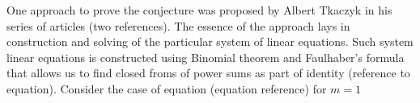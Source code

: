 One approach to prove the conjecture was proposed by Albert Tkaczyk in his series of articles (two references).
The essence of the approach lays in construction and solving of the particular system of linear equations.
Such system linear equations is constructed using Binomial theorem and Faulhaber's formula
that allows us to find closed froms of power sums as part of identity (reference to equation).
Consider the case of equation (equation reference) for $m=1$